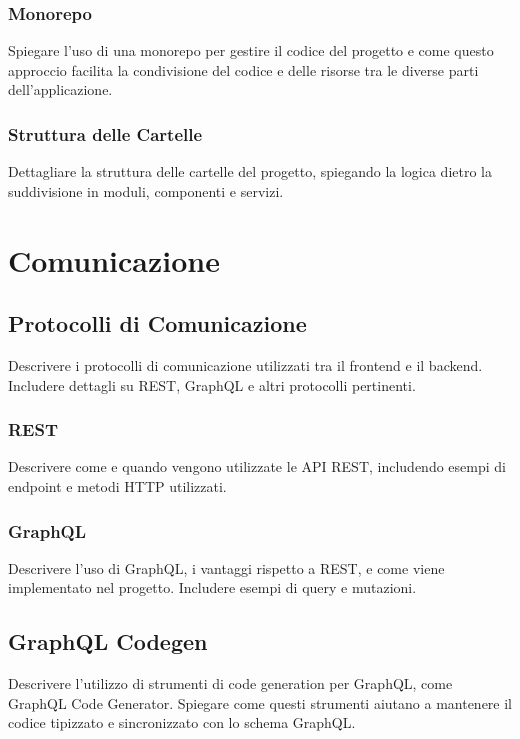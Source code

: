 \subsubsection*{Monorepo}
Spiegare l'uso di una monorepo per gestire il codice del progetto e come questo approccio facilita la condivisione del codice e delle risorse tra le diverse parti dell'applicazione.

\subsubsection*{Struttura delle Cartelle}
Dettagliare la struttura delle cartelle del progetto, spiegando la logica dietro la suddivisione in moduli, componenti e servizi.

\section{Comunicazione}
\label{sec:comunicazione}

\subsection{Protocolli di Comunicazione}
\label{subsec:protocolli_comunicazione}

Descrivere i protocolli di comunicazione utilizzati tra il frontend e il backend. Includere dettagli su REST, GraphQL e altri protocolli pertinenti.

\subsubsection*{REST}
Descrivere come e quando vengono utilizzate le API REST, includendo esempi di endpoint e metodi HTTP utilizzati.

\subsubsection*{GraphQL}
Descrivere l'uso di GraphQL, i vantaggi rispetto a REST, e come viene implementato nel progetto. Includere esempi di query e mutazioni.

\subsection{GraphQL Codegen}
\label{subsec:graphql_codegen}

Descrivere l'utilizzo di strumenti di code generation per GraphQL, come GraphQL Code Generator. Spiegare come questi strumenti aiutano a mantenere il codice tipizzato e sincronizzato con lo schema GraphQL.

